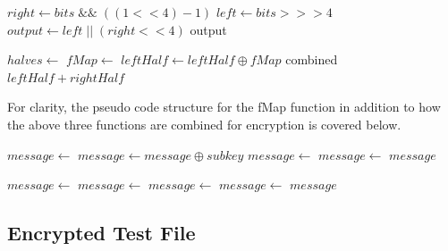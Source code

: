 \documentclass[]{article}
\begin{document}
\vspace{0.5cm}

\begin{algorithmic}
		\State $ right \gets bits \;\&\&\; ( ( 1 << 4 ) - 1 ) $
		\State $ left \gets bits >>> 4 $
		\State $ output \gets left \;||\; ( right << 4 )$
		\State \Return output
	\EndFunction
\end{algorithmic}

\vspace{0.5cm}

\begin{algorithmic}
	
	\State $halves\gets $ 
	\State $fMap \gets $ 	
	\State $ leftHalf \gets leftHalf \oplus fMap $
	\State \Return combined $ leftHalf + rightHalf $
	\EndFunction
\end{algorithmic}

\vspace{0.5cm}
\noindent
For clarity, the pseudo code structure for the fMap function in addition to how the above three functions are combined for encryption is covered below.
\vspace{0.5cm}
\begin{algorithmic}
	
	\State $message\gets $ 
	\State $ message \gets message \oplus subkey $
	\State $ message \gets $ 	
	\State $message\gets $ 	
	\State \Return $message$
	\EndFunction
\end{algorithmic}

\vspace{0.5cm}
\begin{algorithmic}
	
	\State $message\gets $ 
	\State $message\gets $ 
	\State {}	
	\State $message\gets $ 	
	\State $message\gets $ 
	\State \Return $message$
	\EndFunction
\end{algorithmic}

\newpage
\subsection*{Encrypted Test File}
\end{document}
